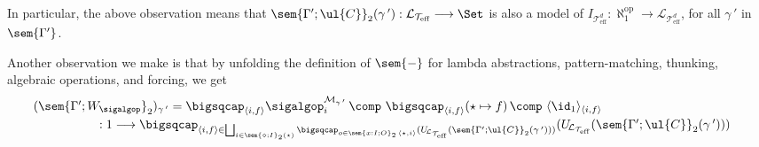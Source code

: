 In particular, the above observation means that $\sem{\Gamma';\ul{C}}_2(\gamma\,') : \mathcal{L}_{\mathcal{T}_{\text{eff}}} \longrightarrow \Set$ is also a model of $I_{\mathcal{T}^d_{\text{eff}}} : \aleph_{\!\!1}^{\text{op}} \longrightarrow \mathcal{L}_{\mathcal{T}^d_{\text{eff}}}$, for all $\gamma\,'$ in $\sem{\Gamma'}$.


Another observation we make is that by unfolding the definition of $\sem{-}$ for lambda abstractions, pattern-matching, thunking, algebraic operations, and forcing, we get 
\[
\begin{array}{c}
\hspace{-4cm}
(\sem{\Gamma';W_{\sigalgop}}_2)_{\gamma\,'} = \bigsqcap_{\langle i , f \rangle} \sigalgop^{\mathcal{M}_{\gamma\,'}}_{i} \,\comp\,\, \bigsqcap_{\langle i , f \rangle} (\star \mapsto f) \,\comp\,\, \langle \id_1 \rangle_{\langle i , f \rangle}
\\[1mm]
\hspace{1.5cm}: 1 \longrightarrow \bigsqcap_{\langle i , f \rangle \in \bigsqcup_{i \in \sem{\diamond;I}_2(\star)} \bigsqcap_{o \in {\sem{x : I ; O}_2\, \langle \star , i \rangle}} (U_{\!\mathcal{L}_{\mathcal{T}_{\text{eff}}}}(\sem{\Gamma';\ul{C}}_2(\gamma\,')))} (U_{\!\mathcal{L}_{\mathcal{T}_{\text{eff}}}}(\sem{\Gamma';\ul{C}}_2(\gamma\,')))
\end{array}
\]


